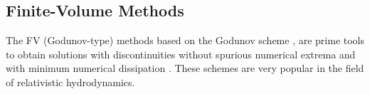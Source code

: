 \subsection{Finite-Volume Methods}


The \ac{FV} (Godunov-type) methods based on the Godunov scheme \citep{Godunov:1959}, 
are prime tools to obtain solutions with discontinuities without spurious numerical extrema and with minimum numerical dissipation \citep{Toro:1999}.
These schemes are very popular in the field of relativistic hydrodynamics. 

